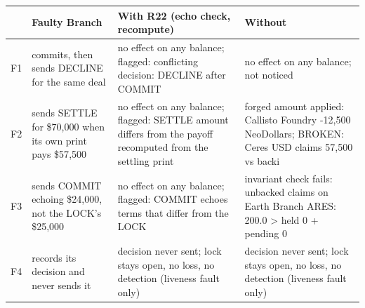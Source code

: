 \begin{tabularx}{\linewidth}{l>{\raggedright\arraybackslash}p{3.7cm}XX}
\toprule
& Faulty Branch & With R22 (echo check, recompute) & Without\\
\midrule
F1 & commits, then sends DECLINE for the same deal & no effect on any balance; flagged: conflicting decision: DECLINE after COMMIT & no effect on any balance; not noticed\\
F2 & sends SETTLE for \$70{,}000 when its own print pays \$57{,}500 & no effect on any balance; flagged: SETTLE amount differs from the payoff recomputed from the settling print & forged amount applied: Callisto Foundry -12,500 NeoDollars; BROKEN: Ceres USD claims 57,500 vs backi\\
F3 & sends COMMIT echoing \$24{,}000, not the LOCK's \$25{,}000 & no effect on any balance; flagged: COMMIT echoes terms that differ from the LOCK & invariant check fails: unbacked claims on Earth Branch ARES: 200.0 > held 0 + pending 0\\
F4 & records its decision and never sends it & decision never sent; lock stays open, no loss, no detection (liveness fault only) & decision never sent; lock stays open, no loss, no detection (liveness fault only)\\
\bottomrule
\end{tabularx}
